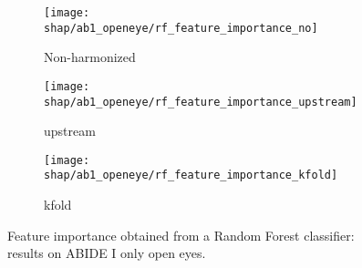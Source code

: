 \documentclass[a4paper,11pt]{article}
\begin{document}
\begin{figure}
\centering
\begin{subfigure}[b]{.45\textwidth}
   \texttt{[image: shap/ab1\_openeye/rf\_feature\_importance\_no]}
   \caption{Non-harmonized}
   \label{}
\end{subfigure}
\begin{subfigure}[b]{.45\textwidth}
   \texttt{[image: shap/ab1\_openeye/rf\_feature\_importance\_upstream]}
   \caption{upstream}
   \label{}
\end{subfigure}
\begin{subfigure}[b]{.45\textwidth}
   \texttt{[image: shap/ab1\_openeye/rf\_feature\_importance\_kfold]}
   \caption{kfold}
   \label{}
\end{subfigure}
\caption{Feature importance obtained from a Random Forest classifier: results on ABIDE I only open eyes.}
\label{fig:rf_feature_importance_ab1}
\end{figure}



\newpage


\appendix
\end{document}
